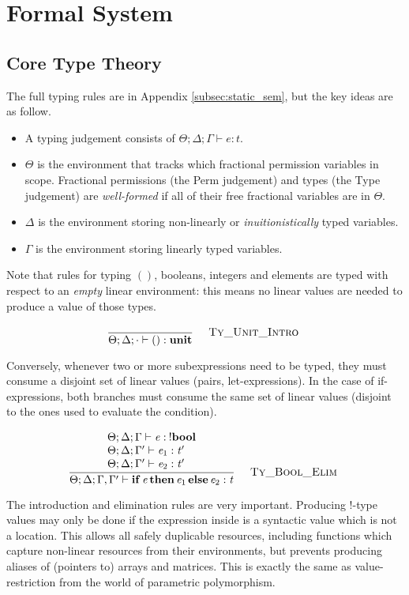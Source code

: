 \section{Formal System}\label{sec:formal_system}

\subsection{Core Type Theory}\label{subsec:core_tt}

The full typing rules are in Appendix \ref{subsec:static_sem}, but the key
ideas are as follow.

\begin{itemize}

    \item A typing judgement consists of $ \Theta; \Delta; \Gamma \vdash e : t$.

    \item $\Theta$ is the environment that tracks which fractional permission variables
        in scope. Fractional permissions (the \textsf{Perm} judgement) and types (the
        \textsf{Type} judgement) are \emph{well-formed} if all of their free fractional
        variables are in $\Theta$.

    \item $\Delta$ is the environment storing non-linearly or \emph{inuitionistically}
        typed variables.

    \item $\Gamma$ is the environment storing linearly typed variables. 

\end{itemize}

Note that rules for typing $()$, booleans, integers and elements are typed
with respect to an \emph{empty} linear environment: this means no linear
values are needed to produce a value of those types.

\vspace{-\baselineskip}
\[
    {\displaystyle\frac{\begin{array}{l} \end{array}}{ \Theta ; \Delta ; \cdot \vdash ( ) : \mathbf{unit}}\quad\textsc{ {\textsc{Ty\_Unit\_Intro}}{} }}
\]

Conversely, whenever two or more subexpressions need to be typed, they must
consume a disjoint set of linear values (pairs, let-expressions).  In the case
of if-expressions, both branches must consume the same set of linear values
(disjoint to the ones used to evaluate the condition).

\vspace{-\baselineskip}
\[
    {\displaystyle\frac{\begin{array}{l} \Theta ; \Delta ; \Gamma \vdash \mathit{e} : \: ! \mathbf{bool} \\ \Theta ; \Delta ; \Gamma' \vdash \mathit{e_{{\mathrm{1}}}} : \mathit{t'} \\ \Theta ; \Delta ; \Gamma' \vdash \mathit{e_{{\mathrm{2}}}} : \mathit{t'} \\ \end{array}}{ \Theta ; \Delta ; \Gamma , \Gamma' \vdash \mathbf{if} \, \mathit{e} \, \mathbf{then} \, \mathit{e_{{\mathrm{1}}}} \, \mathbf{else} \, \mathit{e_{{\mathrm{2}}}} : \mathit{t}}\quad\textsc{ {\textsc{Ty\_Bool\_Elim}}{} }}
\]

The  introduction and elimination rules are very important.
Producing !-type values may only be done if the expression inside is a
syntactic value which is not a location. This allows all safely duplicable
resources, including functions which capture non-linear resources from their
environments, but prevents producing aliases of (pointers to) arrays and
matrices. This is exactly the same as value-restriction from the world of
parametric polymorphism.

